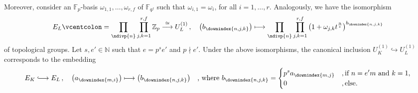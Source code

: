 \documentclass[a4paper, reqno, 10pt]{amsart}
\theoremstyle{definition}
\numberwithin{equation}{section}
\newcommand{\defeq}{\vcentcolon=}
\newcommand{\lra}{\longrightarrow}
\newcommand{\lto}{\longmapsto}
\newcommand{\BF}{{\mathbb {F}}}
\newcommand{\BN}{{\mathbb {N}}}
\newcommand{\BZ}{{\mathbb {Z}}}
\begin{document}
Moreover, consider an $\BF_p$-basis $\omega_{1,1},\ldots,\omega_{r,f}$ of $\BF_{q^f}$ such that $\omega_{i,1} = \omega_{i}$, for all $i=1,\ldots,r$.
Analogously, we have the isomorphism
\begin{align*}
	E_L \defeq \prod_\ndivp{n} \prod_{j,k=1}^{r,f} \BZ_p \overset{\cong}{\lra} U_L^{(1)} \,, \quad \big( b_\downindex{{n,j,k}} \big) \lto \prod_\ndivp{n}\prod_{j,k=1}^{r,f} \left( 1 + \omega_{j,k} t^\frac{n}{e} \right)^{b_\downindex{{n,j,k}}}
\end{align*}
of topological groups.
Let $s,e'\in \BN$ such that $e=p^s e'$ and $p \nmid e'$.
Under the above isomorphisms, the canonical inclusion $U_K^{(1)} \hookrightarrow U_L^{(1)}$ corresponds to the embedding
\begin{equation*}
	E_K \lhook\joinrel\longrightarrow E_L \,,\quad \big( a_\downindex{{m,i}} \big) \lto \big( b_\downindex{{n,j,k}} \big) \quad\text{, where $b_\downindex{{n,j,k}}= \begin{cases}	p^s a_\downindex{m,j} &, \text{if $n=e'm$ and $k=1$,} \\
			0	&, \text{else.}					\end{cases}$}							
\end{equation*}
\end{document}
